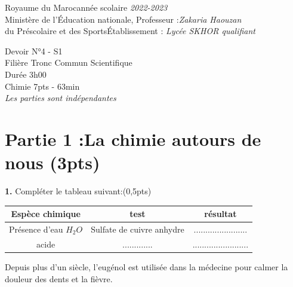 \documentclass[12pt]{article}
\newcommand\headerMe[2]{\noindent{}#1\hfill#2}
\begin{document}
\headerMe{Royaume du Maroc}{année scolaire \emph{2022-2023}}\\
\headerMe{Ministère de l'Éducation nationale, }{  Professeur :\emph{Zakaria Haouzan}}\\
\headerMe{du Préscolaire et des Sports}{Établissement : \emph{Lycée SKHOR qualifiant}}\\

\begin{center}

    \vspace{-1.5cm}
Devoir  N°4 - S1 \\
   Filière Tronc Commun Scientifique\\
Durée 3h00
\\
\hrulefill
\Large{Chimie 7pts - 63min}
\hrulefill\\

    \emph{Les  parties sont indépendantes}
\end{center}
 
    \vspace{-1.2cm}
    
\section*{Partie 1 :La chimie autours de nous \dotfill (3pts) }
	
\textbf{1. }Compléter le tableau suivant:\dotfill(0,5pts)
\begin{center}
\begin{tabular}{ | c | c | c | }
	\hline
	\textbf{Espèce chimique }& \textbf{test} & \textbf{résultat} \\\hline 
 Présence d’eau $H_2O$ & Sulfate de cuivre anhydre & ....................... \\\hline  
 acide & ............. & ........................\\\hline 
\end{tabular}
\end{center}

\hspace{0.5cm}Depuis plus d’un siècle, l’eugénol est utilisée dans la médecine pour calmer la douleur des dents et la fièvre. 
\end{document}
